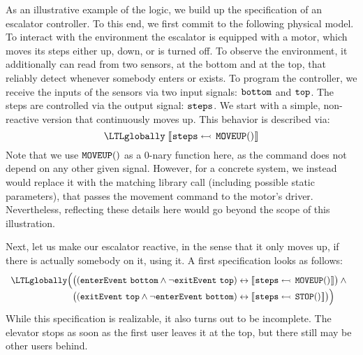 As an illustrative example of the logic, we build up the
specification of an escalator controller. To this end, we first commit
to the following physical model.
To interact with the environment the escalator is equipped with a
motor, which moves its steps either up, down, or is turned off. To
observe the environment, it additionally can read from two sensors, at
the bottom and at the top, that reliably detect whenever somebody
enters or exists. To program the controller, we receive the inputs of
the sensors via two input signals: $ {\text{\texttt{bottom}}} $ and
$ {\text{\texttt{top}}} $. The steps are controlled via the output signal:
$ {\text{\texttt{steps}}} $.
We start with a simple, non-reactive version that continuously moves
up. This behavior is described via:
%
\begin{equation*}
  \LTLglobally \; \upd{\name{steps}}{\name{MOVEUP}()}
\end{equation*}
%
Note that we use $ {\text{\texttt{MOVEUP}}}() $ as a $ 0 $-nary function here, as
the command does not depend on any other given signal. However, for a
concrete system, we instead would replace it with the matching library
call (including possible static parameters), that passes the movement
command to the motor's driver. Nevertheless, reflecting these details here
would go beyond the scope of this illustration.

Next, let us make our escalator reactive, in the sense that it only
moves up, if there is actually somebody on it, using it.
A first specification looks as follows:
%
\begin{equation*}
  \begin{array}{l}
    \LTLglobally \Big( \big( (\name{enterEvent}~\name{bottom} \wedge \neg \name{exitEvent}~\name{top})
    \leftrightarrow \upd{\name{steps}}{\name{MOVEUP}()} \big) \wedge \mbox{\ } \\
    \phantom{\LTLglobally \Big(} \big( (\name{exitEvent}~\name{top} \wedge \neg \name{enterEvent}~\name{bottom})
    \leftrightarrow \upd{\name{steps}}{\name{STOP}()} \big) \Big)
  \end{array}
\end{equation*}
%
While this specification is realizable, it also turns out to be
incomplete. The elevator stops as soon as the first user leaves it at
the top, but there still may be other users behind.

